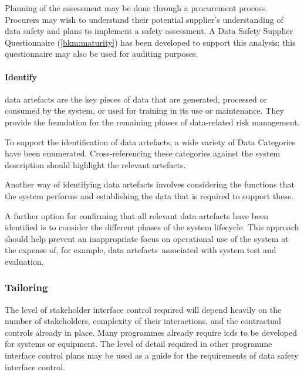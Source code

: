 Planning of the assessment may be done through a procurement process. Procurers may wish to understand their potential supplier's understanding of data safety and plans to implement a \gls{safety assessment}. A Data Safety Supplier Questionnaire (\autoref{bkm:maturity}) has been developed to support this analysis; this questionnaire may also be used for auditing purposes.

\paragraph{Identify }
\Glspl{data artefact} are the key pieces of data that are generated, processed or consumed by the system, or used for training in its use or maintenance. They provide the foundation for the remaining phases of data-related risk management.

To support the identification of \glspl{data artefact}, a wide variety of Data Categories have been enumerated. Cross-referencing these categories against the system description should highlight the relevant artefacts. 

Another way of identifying \glspl{data artefact} involves considering the functions that the system performs and establishing the data that is required to support these.

A further option for confirming that all relevant \glspl{data artefact} have been identified is to consider the different phases of the system lifecycle. This approach should help prevent an inappropriate focus on operational use of the system at the expense of, for example, \cbstart\glspl{data artefact}\cbend\ associated with system test and evaluation.

\subsubsection{Tailoring}
The level of
\gls{stakeholder}
interface control required will depend heavily on the number of \glspl{stakeholder}, complexity of their interactions, and the contractual controls already in place. Many programmes already require \glspl{icd} to be developed for systems or equipment. The level of detail required in other programme interface control plans may be used as a guide for the requirements of data safety interface control. 

